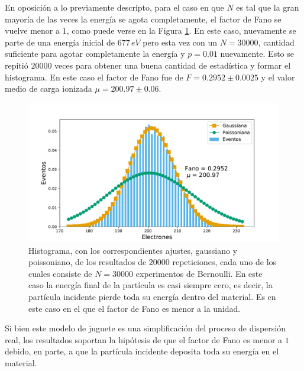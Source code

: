 En oposición a lo previamente descripto, para el caso en que $N$ es tal que la gran mayoría de las veces la energía se agota completamente, el factor de Fano se vuelve menor a $1$, como puede verse en la Figura \ref{fig:SimulacionOrden0Fano0}. En este caso, nuevamente se parte de una energía inicial de $677\,\si{eV}$ pero esta vez con un $N = 30000$, cantidad suficiente para agotar completamente la energía y $p=0.01$ nuevamente. Esto se repitió $20000$ veces para obtener una buena cantidad de estadística y formar el histograma. En este caso el factor de Fano fue de $F = 0.2952 \pm 0.0025$ y el valor medio de carga ionizada $\mu = 200.97 \pm 0.06$.
\begin{figure}[h]
    \centering
    \includegraphics[scale=0.5]{Figs/Orden0_fano0.pdf}
    \caption{Histograma, con los correspondientes ajustes, gaussiano y poissoniano, de los resultados de $20000$ repeticiones, cada uno de los cuales consiste de $N = 30000$ experimentos de Bernoulli. En este caso la energía final de la partícula es casi siempre cero, es decir, la partícula incidente pierde toda su energía dentro del material. Es en este caso en el que el factor de Fano es menor a la unidad.}
    \label{fig:SimulacionOrden0Fano0}
\end{figure}

Si bien este modelo de juguete es una simplificación del proceso de dispersión real, los resultados soportan la hipótesis de que el factor de Fano es menor a $1$ debido, en parte, a que la partícula incidente deposita toda su energía en el material.
